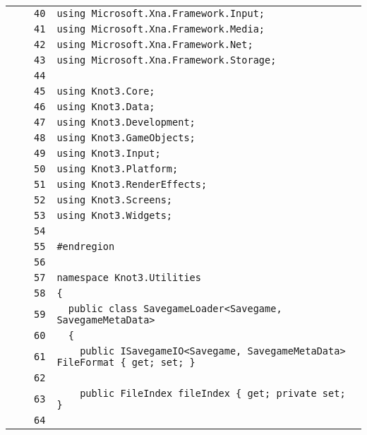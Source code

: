 \documentclass[a4paper,10pt]{article}
\begin{document}
\begin{longtable}[l]{lrrl}
\cellcolor{gray} &  & \verb~40~ & \verb~using Microsoft.Xna.Framework.Input;~\\
\cellcolor{gray} &  & \verb~41~ & \verb~using Microsoft.Xna.Framework.Media;~\\
\cellcolor{gray} &  & \verb~42~ & \verb~using Microsoft.Xna.Framework.Net;~\\
\cellcolor{gray} &  & \verb~43~ & \verb~using Microsoft.Xna.Framework.Storage;~\\
\cellcolor{gray} &  & \verb~44~ & \verb~~\\
\cellcolor{gray} &  & \verb~45~ & \verb~using Knot3.Core;~\\
\cellcolor{gray} &  & \verb~46~ & \verb~using Knot3.Data;~\\
\cellcolor{gray} &  & \verb~47~ & \verb~using Knot3.Development;~\\
\cellcolor{gray} &  & \verb~48~ & \verb~using Knot3.GameObjects;~\\
\cellcolor{gray} &  & \verb~49~ & \verb~using Knot3.Input;~\\
\cellcolor{gray} &  & \verb~50~ & \verb~using Knot3.Platform;~\\
\cellcolor{gray} &  & \verb~51~ & \verb~using Knot3.RenderEffects;~\\
\cellcolor{gray} &  & \verb~52~ & \verb~using Knot3.Screens;~\\
\cellcolor{gray} &  & \verb~53~ & \verb~using Knot3.Widgets;~\\
\cellcolor{gray} &  & \verb~54~ & \verb~~\\
\cellcolor{gray} &  & \verb~55~ & \verb~#endregion~\\
\cellcolor{gray} &  & \verb~56~ & \verb~~\\
\cellcolor{gray} &  & \verb~57~ & \verb~namespace Knot3.Utilities~\\
\cellcolor{gray} &  & \verb~58~ & \verb~{~\\
\cellcolor{gray} &  & \verb~59~ & \verb~  public class SavegameLoader<Savegame, SavegameMetaData>~\\
\cellcolor{gray} &  & \verb~60~ & \verb~  {~\\
\cellcolor{gray} &  & \verb~61~ & \verb~    public ISavegameIO<Savegame, SavegameMetaData> FileFormat { get; set; }~\\
\cellcolor{gray} &  & \verb~62~ & \verb~~\\
\cellcolor{gray} &  & \verb~63~ & \verb~    public FileIndex fileIndex { get; private set; }~\\
\cellcolor{gray} &  & \verb~64~ & \verb~~\\

\end{longtable}
\end{document}
